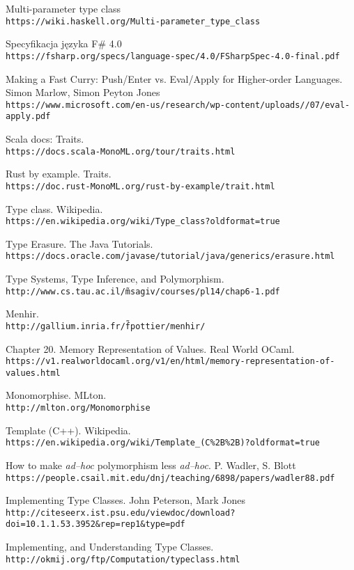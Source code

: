 \documentclass[declaration,shortabstract]{iithesis}
\begin{document}
\begin{thebibliography}{1}
Multi-parameter type class
\\\texttt{https://wiki.haskell.org/Multi-parameter\_type\_class}

Specyfikacja języka F\# 4.0
\\\texttt{https://fsharp.org/specs/language-spec/4.0/FSharpSpec-4.0-final.pdf}

Making a Fast Curry: Push/Enter vs.
Eval/Apply for Higher-order Languages. Simon Marlow, Simon Peyton Jones
\\\texttt{https://www.microsoft.com/en-us/research/wp-content/uploads//07/eval-apply.pdf}

Scala docs: Traits.
\\\texttt{https://docs.scala-MonoML.org/tour/traits.html}

Rust by example. Traits.
\\\texttt{https://doc.rust-MonoML.org/rust-by-example/trait.html}

Type class. Wikipedia.
\\\texttt{https://en.wikipedia.org/wiki/Type\_class?oldformat=true}

Type Erasure. The Java Tutorials.
\\\texttt{https://docs.oracle.com/javase/tutorial/java/generics/erasure.html}

Type Systems, Type Inference, and Polymorphism.
\\\texttt{http://www.cs.tau.ac.il/\~msagiv/courses/pl14/chap6-1.pdf}

Menhir.
\\\texttt{http://gallium.inria.fr/\~fpottier/menhir/}

Chapter 20. Memory Representation of Values. Real World OCaml.
\\\texttt{https://v1.realworldocaml.org/v1/en/html/memory-representation-of-values.html}

Monomorphise. MLton.
\\\texttt
{http://mlton.org/Monomorphise}

Template (C++). Wikipedia.
\\\texttt
{https://en.wikipedia.org/wiki/Template\_(C\%2B\%2B)?oldformat=true}

How to make \textit{ad--hoc} polymorphism less \textit{ad--hoc}. 
P. Wadler, S. Blott
\\\texttt
{https://people.csail.mit.edu/dnj/teaching/6898/papers/wadler88.pdf}

Implementing Type Classes. John Peterson, Mark Jones
\\\texttt
{http://citeseerx.ist.psu.edu/viewdoc/download?doi=10.1.1.53.3952\&rep=rep1\&type=pdf}

Implementing, and Understanding Type Classes.
\\\texttt
{http://okmij.org/ftp/Computation/typeclass.html}

\end{thebibliography}
\end{document}
